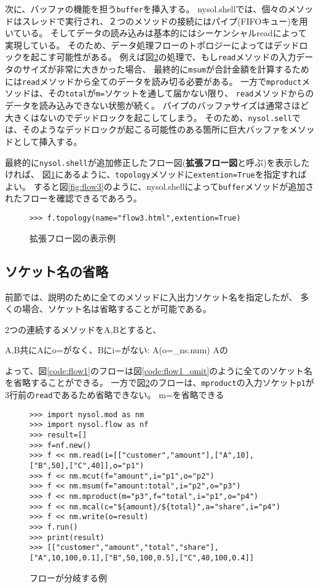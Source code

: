 次に、バッファの機能を担う\verb|buffer|を挿入する。
nysol.shellでは、個々のメソッドはスレッドで実行され、２つのメソッドの接続にはパイプ(FIFOキュー)を用いている。
そしてデータの読み込みは基本的にはシーケンシャルreadによって実現している。
そのため、データ処理フローのトポロジーによってはデッドロックを起こす可能性がある。
例えば図\ref{code:flow2}の処理で、もし\verb|read|メソッドの入力データのサイズが非常に大きかった場合、
最終的に\verb|msum|が合計金額を計算するためには\verb|read|メソッドから全てのデータを読み切る必要がある。
一方で\verb|mproduct|メソッドは、その\verb|total|が\verb|m=|ソケットを通して届かない限り、
\verb|read|メソッドからのデータを読み込みできない状態が続く。
パイプのバッファサイズは通常さほど大きくはないのでデッドロックを起こしてしまう。
そのため、\verb|nysol.sell|では、そのようなデッドロックが起こる可能性のある箇所に巨大バッファをメソッドとして挿入する。

最終的に\verb|nysol.shell|が追加修正したフロー図({\bf 拡張フロー図}と呼ぶ)を表示したければ、
図\ref{code:flow3}にあるように、\verb|topology|メソッドに\verb|extention=True|を指定すればよい。
すると図\ref{fig:flow3}のように、nysol.shellによって\verb|buffer|メソッドが追加されたフローを確認できるであろう。

\begin{figure}[htbp]
\begin{Verbatim}[baselinestretch=0.7,frame=single]
>>> f.topology(name="flow3.html",extention=True)
\end{Verbatim}
\caption{拡張フロー図の表示例\label{code:flow3}}
\end{figure}

\subsection{ソケット名の省略}
前節では、説明のために全てのメソッドに入出力ソケット名を指定したが、
多くの場合、ソケット名は省略することが可能である。

2つの連続するメソッドをA,Bとすると、

A,B共にAにo=がなく、Bにi=がない: A(o=\_ns.num)
Aの

よって、図\ref{code:flow1}のフローは図\ref{code:flow1_omit}のように全てのソケット名を省略することができる。
一方で図\ref{code:flow2}のフローは、\verb|mproduct|の入力ソケット\verb|p1|が3行前の\verb|read|であるため省略できない。
m=を省略できる

\begin{figure}[htbp]
\begin{Verbatim}[baselinestretch=0.7,frame=single]
>>> import nysol.mod as nm
>>> import nysol.flow as nf
>>> result=[]
>>> f=nf.new()
>>> f << nm.read(i=[["customer","amount"],["A",10],["B",50],["C",40]],o="p1")
>>> f << nm.mcut(f="amount",i="p1",o="p2")
>>> f << nm.msum(f="amount:total",i="p2",o="p3")
>>> f << nm.mproduct(m="p3",f="total",i="p1",o="p4")
>>> f << nm.mcal(c="${amount}/${total}",a="share",i="p4")
>>> f << nm.write(o=result)
>>> f.run()
>>> print(result)
>>> [["customer","amount","total","share"],["A",10,100,0.1],["B",50,100,0.5],["C",40,100,0.4]]
\end{Verbatim}
\caption{フローが分岐する例\label{code:flow2}}
\end{figure}

